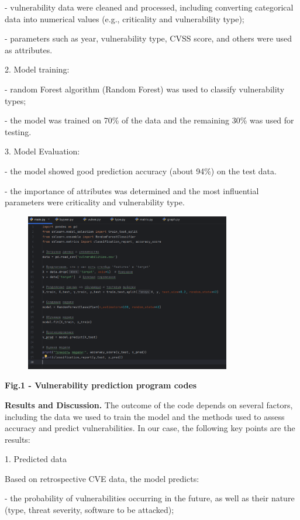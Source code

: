 - vulnerability data were cleaned and processed, including converting
categorical data into numerical values (e.g., criticality and
vulnerability type);

- parameters such as year, vulnerability type, CVSS score, and others
were used as attributes.

2. Model training:

- random Forest algorithm (Random Forest) was used to classify
vulnerability types;

- the model was trained on 70\% of the data and the remaining 30\% was
used for testing.

3. Model Evaluation:

- the model showed good prediction accuracy (about 94\%) on the test
data.

- the importance of attributes was determined and the most influential
parameters were criticality and vulnerability type.


\begin{figure}[H]
	\centering
	\includegraphics[width=0.8\textwidth]{media/ict2/image165}
	\caption*{}
\end{figure}


{\bfseries Fig.1 - Vulnerability prediction program codes}

{\bfseries Results and Discussion.} The outcome of the code depends on
several factors, including the data we used to train the model and the
methods used to assess accuracy and predict vulnerabilities. In our
case, the following key points are the results:

1. Predicted data

Based on retrospective CVE data, the model predicts:

- the probability of vulnerabilities occurring in the future, as well as
their nature (type, threat severity, software to be attacked);

